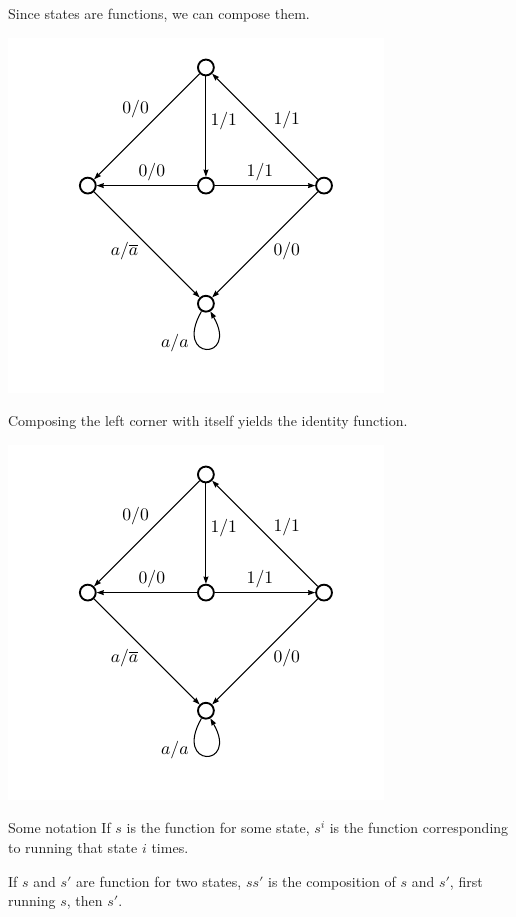 \documentclass{beamer}
\begin{document}
\begin{frame}
  Since states are functions, we can compose them.
  \begin{center}
    \includegraphics[scale=0.4]{../figures/grigorchuk}
  \end{center}
\end{frame}

\begin{frame}
  Composing the left corner with itself yields the identity function.
  \begin{center}
    \includegraphics[scale=0.4]{../figures/grigorchuk}
  \end{center}
\end{frame}

\begin{frame}{Some notation}
  If $s$ is the function for some state, $s^i$ is the function
  corresponding to running that state $i$ times.

  If $s$ and $s'$ are function for two states, $s s'$ is the
  composition of $s$ and $s'$, first running $s$, then $s'$.
\end{frame}
\end{document}
